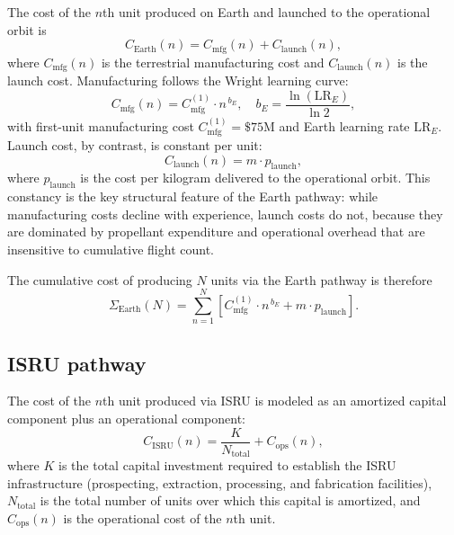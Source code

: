 \documentclass[preprint,12pt]{elsarticle}
\begin{document}
The cost of the $n$th unit produced on Earth and launched to the operational orbit is
\begin{equation}
  C_{\mathrm{Earth}}(n) = C_{\mathrm{mfg}}(n) + C_{\mathrm{launch}}(n),
  \label{eq:earth_unit}
\end{equation}
where $C_{\mathrm{mfg}}(n)$ is the terrestrial manufacturing cost and $C_{\mathrm{launch}}(n)$ is the launch cost. Manufacturing follows the Wright learning curve:
\begin{equation}
  C_{\mathrm{mfg}}(n) = C_{\mathrm{mfg}}^{(1)} \cdot n^{\,b_E}, \quad b_E = \frac{\ln(\mathrm{LR}_E)}{\ln 2},
  \label{eq:earth_mfg}
\end{equation}
with first-unit manufacturing cost $C_{\mathrm{mfg}}^{(1)} = \$75$M and Earth learning rate $\mathrm{LR}_E$. Launch cost, by contrast, is constant per unit:
\begin{equation}
  C_{\mathrm{launch}}(n) = m \cdot p_{\mathrm{launch}},
  \label{eq:earth_launch}
\end{equation}
where $p_{\mathrm{launch}}$ is the cost per kilogram delivered to the operational orbit. This constancy is the key structural feature of the Earth pathway: while manufacturing costs decline with experience, launch costs do not, because they are dominated by propellant expenditure and operational overhead that are insensitive to cumulative flight count.

The cumulative cost of producing $N$ units via the Earth pathway is therefore
\begin{equation}
  \Sigma_{\mathrm{Earth}}(N) = \sum_{n=1}^{N} \left[ C_{\mathrm{mfg}}^{(1)} \cdot n^{\,b_E} + m \cdot p_{\mathrm{launch}} \right].
  \label{eq:earth_cum}
\end{equation}

\subsection{ISRU pathway}

The cost of the $n$th unit produced via ISRU is modeled as an amortized capital component plus an operational component:
\begin{equation}
  C_{\mathrm{ISRU}}(n) = \frac{K}{N_{\mathrm{total}}} + C_{\mathrm{ops}}(n),
  \label{eq:isru_unit}
\end{equation}
where $K$ is the total capital investment required to establish the ISRU infrastructure (prospecting, extraction, processing, and fabrication facilities), $N_{\mathrm{total}}$ is the total number of units over which this capital is amortized, and $C_{\mathrm{ops}}(n)$ is the operational cost of the $n$th unit.
\end{document}
